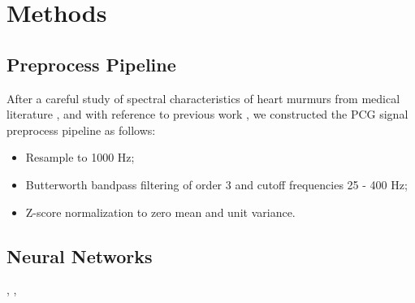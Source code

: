 \section{Methods}
\label{sec:methods}

\subsection{Preprocess Pipeline}
\label{subsec:preproc}

After a careful study of spectral characteristics of heart murmurs from medical literature \cite{Donnerstein_1989, Noponen_2007}, and with reference to previous work \cite{Schmidt_2010}, we constructed the PCG signal preprocess pipeline as follows:
\begin{itemize}
    \item Resample to 1000 Hz;
    \item Butterworth bandpass filtering of order 3 and cutoff frequencies 25 - 400 Hz;
    \item Z-score normalization to zero mean and unit variance.
\end{itemize}

\subsection{Neural Networks}
\label{subsec:nn}
\cite{baevski2020wav2vec}, \cite{wolf-etal-2020-transformers}, \cite{Kang_2022_cinc2021_iop}
